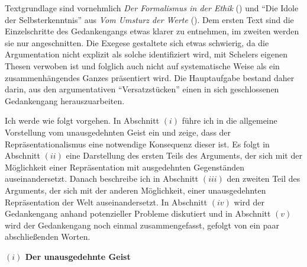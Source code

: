 \documentclass[a4paper, 12pt]{article}
\begin{document}
\begin{onehalfspace}
Textgrundlage sind vornehmlich \emph{Der Formalismus in der Ethik} (\cite{scheler-ethik}) und "`Die Idole der Selbsterkenntnis"' aus \emph{Vom Umsturz der Werte} (\cite{scheler-idole}). Dem ersten Text sind die Einzelschritte des Gedankengangs etwas klarer zu entnehmen, im zweiten werden sie nur angeschnitten. Die Exegese gestaltete sich etwas schwierig, da die Argumentation nicht explizit als solche identifiziert wird, mit Schelers eigenen Thesen verwoben ist und folglich auch nicht auf systematische Weise als ein zusammenhängendes Ganzes präsentiert wird. Die Hauptaufgabe bestand daher darin, aus den argumentativen "`Versatzstücken"' einen in sich geschlossenen Gedankengang herauszuarbeiten. 

\vspace{3mm}

Ich werde wie folgt vorgehen. In Abschnitt $(i)$ führe ich in die allgemeine Vorstellung vom unausgedehnten Geist ein und zeige, dass der Repräsentationalismus eine notwendige Konsequenz dieser ist. Es folgt in Abschnitt $(ii)$ eine Darstellung des ersten Teils des Arguments, der sich mit der Möglichkeit einer Repräsentation mit ausgedehnten Gegenständen auseinandersetzt. Danach beschreibe ich in Abschnitt $(iii)$ den zweiten Teil des Arguments, der sich mit der anderen Möglichkeit, einer unausgedehnten Repräsentation der Welt auseinandersetzt. In Abschnitt $(iv)$ wird der Gedankengang anhand potenzieller Probleme diskutiert und in Abschnitt $(v)$ wird der Gedankengang noch einmal zusammengefasst, gefolgt von ein paar abschließenden Worten.


\vspace{5mm}
\noindent\textbf{$(i)$ Der unausgedehnte Geist}



\end{onehalfspace}
\end{document}
